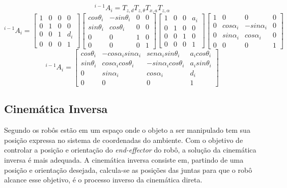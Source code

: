 \begin{equation}
^{i-1}A_{i}=T_{z,d} T_{z,\theta} T_{x,a} T_{z,\alpha}
\end{equation}
\begin{equation}
^{i-1}A_{i}=\begin{bmatrix}
1 & 0 & 0 & 0\\ 
0 & 1 & 0 & 0\\ 
0 & 0 & 1 & d_{i}\\ 
0 & 0 & 0 & 1
\end{bmatrix}\begin{bmatrix}
cos\theta_{i} & -sin\theta_{i} & 0 & 0\\ 
sin\theta_{i} & cos\theta_{i} & 0 & 0\\ 
0 & 0 & 1 & 0\\ 
0 & 0 & 0 & 1
\end{bmatrix}\begin{bmatrix}
1 & 0 & 0 & a_{i}\\ 
0 & 1 & 0 & 0\\ 
0 & 0 & 1 & 0\\ 
0 & 0 & 0 & 1
\end{bmatrix}\begin{bmatrix}
1 & 0 & 0 & 0\\ 
0 & cos\alpha_{i} & -sin\alpha_{i} & 0\\ 
0 & sin\alpha_{i} & cos\alpha_{i} & 0\\ 
0 & 0 & 0 & 1
\end{bmatrix}\end{equation}
\begin{equation}
^{i-1}A_{i}=\begin{bmatrix}
cos\theta_{i} & -cos\alpha_{i}sin\alpha_{i} & sen\alpha_{i}sin\theta_{i} & a_{i}cos\theta_{i}\\ 
sin\theta_{i} & cos\alpha_{i}cos\theta_{i} & -sin\alpha_{i}cos\theta_{i} & a_{i}sin\theta_{i}\\ 
0 & sin\alpha_{i} & cos\alpha_{i} & d_{i}\\ 
0 & 0 & 0 & 1
\end{bmatrix}
\end{equation}

\subsection{Cinemática Inversa}\label{sec:cinem_inv}
Segundo \cite{fu1987robotics} os robôs estão em um espaço onde o objeto a ser manipulado tem sua posição expressa no sistema de coordenadas do ambiente. Com o objetivo de controlar a posição e orientação do \textit{end-effector} do robô, a solução da cinemática inversa é mais adequada. A cinemática inversa consiste em, partindo de uma posição e orientação desejada, calcula-se as posições das juntas para que o robô alcance esse objetivo, é o processo inverso da cinemática direta. 

